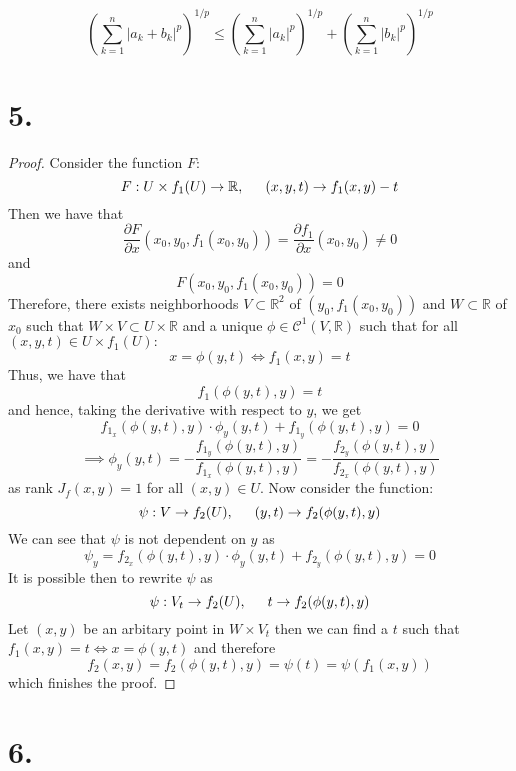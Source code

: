 \documentclass[11pt]{article}
\begin{document}
\[
    \left(\sum_{k=1}^n |a_k+b_k|^p \right)^{1/p} \le \left(\sum_{k=1}^n |a_k|^p \right)^{1/p} 
    + \left(\sum_{k=1}^n |b_k|^p \right)^{1/p}
\]
\pagebreak
\section*{5.}
\begin{proof}
Consider the function $F$:
\[
    F: U \times f_1(U) \to \mathbb{R}, \indent (x,y,t) \to f_1(x,y) - t    
\]
Then we have that
\[
    \frac{\partial F}{\partial x}(x_0,y_0,f_1(x_0,y_0)) = \frac{\partial f_1}{\partial x}(x_0,y_0) \ne 0   
\]
and 
\[
    F(x_0,y_0,f_1(x_0,y_0)) = 0    
\]
Therefore, there exists neighborhoods $V \subset \mathbb{R}^2$ of $(y_0,f_1(x_0,y_0))$ and
$W \subset \mathbb{R}$ of $x_0$ such that $W \times V \subset U \times \mathbb{R}$ and 
a unique $\phi \in \mathcal{C}^1(V, \mathbb{R})$ such that for all $(x,y,t) \in U \times f_1(U):$
\[
    x = \phi(y,t) \iff f_1(x,y) = t 
\]
Thus, we have that
\[
    f_1(\phi(y,t),y) = t
\]
and hence, taking the derivative with respect to $y$, we get
\[
    f_{1_x}(\phi(y,t),y) \cdot \phi_y(y,t) + f_{1_y}(\phi(y,t),y) = 0
\]
\[
    \implies \phi_y(y,t) = -\frac{f_{1_y}(\phi(y,t),y)}{f_{1_x}(\phi(y,t),y)} = -\frac{f_{2_y}(\phi(y,t),y)}{f_{2_x}(\phi(y,t),y)} 
\]
as rank $J_f(x,y) = 1$ for all $(x,y) \in U$.
Now consider the function:
\[
    \psi: V \to f_2(U), \indent (y,t) \to f_2(\phi(y,t),y)
\]
We can see that $\psi$ is not dependent on $y$ as 
\[
    \psi_y = f_{2_x}(\phi(y,t),y) \cdot \phi_y(y,t) + f_{2_y}(\phi(y,t),y) = 0
\]
It is possible then to rewrite $\psi$ as 
\[
    \psi: V_t \to f_2(U), \indent t \to f_2(\phi(y,t),y)    
\]
Let $(x, y)$ be an arbitary point in $W \times V_t$ 
then we can find a $t$ such that $f_1(x,y) = t \iff x = \phi(y,t)$ and therefore
\[
    f_2(x,y) = f_2(\phi(y,t),y) = \psi(t) = \psi(f_1(x,y))    
\]
which finishes the proof.
\end{proof}
\pagebreak
\section*{6.}
\end{document}
